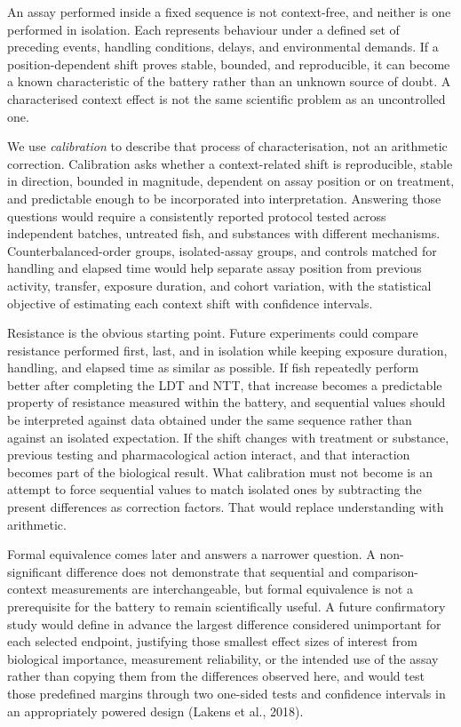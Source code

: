 \documentclass[12pt,a4paper]{article}
\begin{document}
An assay performed inside a fixed sequence is not context-free, and neither is one performed in isolation. Each represents behaviour under a defined set of preceding events, handling conditions, delays, and environmental demands. If a position-dependent shift proves stable, bounded, and reproducible, it can become a known characteristic of the battery rather than an unknown source of doubt. A characterised context effect is not the same scientific problem as an uncontrolled one.

We use \emph{calibration} to describe that process of characterisation, not an arithmetic correction. Calibration asks whether a context-related shift is reproducible, stable in direction, bounded in magnitude, dependent on assay position or on treatment, and predictable enough to be incorporated into interpretation. Answering those questions would require a consistently reported protocol tested across independent batches, untreated fish, and substances with different mechanisms. Counterbalanced-order groups, isolated-assay groups, and controls matched for handling and elapsed time would help separate assay position from previous activity, transfer, exposure duration, and cohort variation, with the statistical objective of estimating each context shift with confidence intervals.

Resistance is the obvious starting point. Future experiments could compare resistance performed first, last, and in isolation while keeping exposure duration, handling, and elapsed time as similar as possible. If fish repeatedly perform better after completing the LDT and NTT, that increase becomes a predictable property of resistance measured within the battery, and sequential values should be interpreted against data obtained under the same sequence rather than against an isolated expectation. If the shift changes with treatment or substance, previous testing and pharmacological action interact, and that interaction becomes part of the biological result. What calibration must not become is an attempt to force sequential values to match isolated ones by subtracting the present differences as correction factors. That would replace understanding with arithmetic.

Formal equivalence comes later and answers a narrower question. A non-significant difference does not demonstrate that sequential and comparison-context measurements are interchangeable, but formal equivalence is not a prerequisite for the battery to remain scientifically useful. A future confirmatory study would define in advance the largest difference considered unimportant for each selected endpoint, justifying those smallest effect sizes of interest from biological importance, measurement reliability, or the intended use of the assay rather than copying them from the differences observed here, and would test those predefined margins through two one-sided tests and confidence intervals in an appropriately powered design (Lakens et al., 2018).
\end{document}
